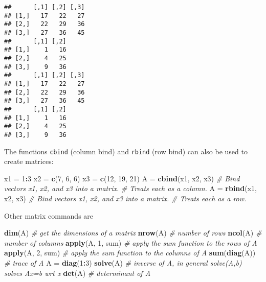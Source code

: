 \documentclass[]{article}
\newenvironment{Shaded}{\begin{snugshade}}{\end{snugshade}}
\newcommand{\KeywordTok}[1]{\textcolor[rgb]{0.13,0.29,0.53}{\textbf{#1}}}
\newcommand{\DecValTok}[1]{\textcolor[rgb]{0.00,0.00,0.81}{#1}}
\newcommand{\StringTok}[1]{\textcolor[rgb]{0.31,0.60,0.02}{#1}}
\newcommand{\CommentTok}[1]{\textcolor[rgb]{0.56,0.35,0.01}{\textit{#1}}}
\newcommand{\OperatorTok}[1]{\textcolor[rgb]{0.81,0.36,0.00}{\textbf{#1}}}
\newcommand{\NormalTok}[1]{#1}
\begin{document}
\begin{Shaded}
\end{Shaded}

\begin{verbatim}
##      [,1] [,2] [,3]
## [1,]   17   22   27
## [2,]   22   29   36
## [3,]   27   36   45
##      [,1] [,2]
## [1,]    1   16
## [2,]    4   25
## [3,]    9   36
##      [,1] [,2] [,3]
## [1,]   17   22   27
## [2,]   22   29   36
## [3,]   27   36   45
##      [,1] [,2]
## [1,]    1   16
## [2,]    4   25
## [3,]    9   36
\end{verbatim}

The functions \texttt{cbind} (column bind) and \texttt{rbind} (row bind)
can also be used to create matrices:

\begin{Shaded}
\begin{Highlighting}[]
\NormalTok{x1 =}\StringTok{ }\DecValTok{1}\OperatorTok{:}\DecValTok{3}
\NormalTok{x2 =}\StringTok{ }\KeywordTok{c}\NormalTok{(}\DecValTok{7}\NormalTok{, }\DecValTok{6}\NormalTok{, }\DecValTok{6}\NormalTok{)}
\NormalTok{x3 =}\StringTok{ }\KeywordTok{c}\NormalTok{(}\DecValTok{12}\NormalTok{, }\DecValTok{19}\NormalTok{, }\DecValTok{21}\NormalTok{)}
\NormalTok{A =}\StringTok{ }\KeywordTok{cbind}\NormalTok{(x1, x2, x3)  }\CommentTok{# Bind vectors x1, x2, and x3 into a matrix.}
\CommentTok{# Treats each as a column.}
\NormalTok{A =}\StringTok{ }\KeywordTok{rbind}\NormalTok{(x1, x2, x3)  }\CommentTok{# Bind vectors x1, x2, and x3 into a matrix.}
\CommentTok{# Treats each as a row.}
\end{Highlighting}
\end{Shaded}

Other matrix commands are

\begin{Shaded}
\begin{Highlighting}[]
\KeywordTok{dim}\NormalTok{(A)  }\CommentTok{# get the dimensions of a matrix}
\KeywordTok{nrow}\NormalTok{(A)  }\CommentTok{# number of rows}
\KeywordTok{ncol}\NormalTok{(A)  }\CommentTok{# number of columns}
\KeywordTok{apply}\NormalTok{(A, }\DecValTok{1}\NormalTok{, sum)  }\CommentTok{# apply the sum function to the rows of A}
\KeywordTok{apply}\NormalTok{(A, }\DecValTok{2}\NormalTok{, sum)  }\CommentTok{# apply the sum function to the columns of A}
\KeywordTok{sum}\NormalTok{(}\KeywordTok{diag}\NormalTok{(A))  }\CommentTok{# trace of A}
\NormalTok{A =}\StringTok{ }\KeywordTok{diag}\NormalTok{(}\DecValTok{1}\OperatorTok{:}\DecValTok{3}\NormalTok{)}
\KeywordTok{solve}\NormalTok{(A)  }\CommentTok{# inverse of A, in general solve(A,b) solves Ax=b wrt x}
\KeywordTok{det}\NormalTok{(A)  }\CommentTok{# determinant of A}
\end{Highlighting}
\end{Shaded}
\end{document}
